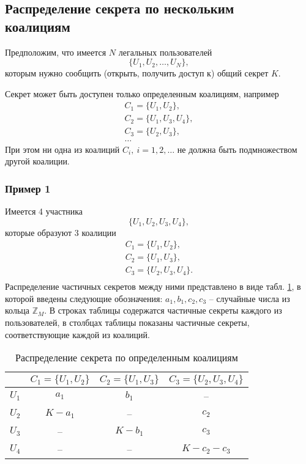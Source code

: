\documentclass[10pt,a4paper]{book}
\newcommand{\group}[1]{\mathbb{#1}}
\newcommand{\Z}{\group{Z}}
\begin{document}
\subsection[Схема для нескольких коалиций]{Распределение секрета по нескольким \protect\\ коалициям}

Предположим, что имеется $N$ легальных пользователей
    \[ \{ U_1, U_2, \dots, U_N \}, \]
которым нужно сообщить (открыть, получить доступ к) общий секрет $K$.

Секрет может быть доступен только определенным  коалициям, например
\[ \begin{array}{l}
    C_1 = \{ U_1, U_2 \}, \\
    C_2 = \{ U_1, U_3, U_4 \}, \\
    C_3 = \{ U_2, U_3 \}, \\
    \dots
\end{array} \]
При этом ни одна из коалиций $C_i, ~ i = 1, 2, \dots$ не должна быть подмножеством другой коалиции.


\subsubsection{Пример 1}

Имеется 4 участника
    \[ \{ U_1, U_2, U_3, U_4 \}, \]
которые образуют 3 коалиции
\[ \begin{array}{l}
    C_1 = \{ U_1, U_2 \}, \\
    C_2 = \{ U_1, U_3 \}, \\
    C_3 = \{ U_2, U_3, U_4 \}. \\
\end{array} \]
Распределение частичных секретов между ними представлено в виде табл. \ref{tab:secret-share-coalition-1}, в которой введены следующие обозначения: $a_1, b_1, c_2, c_3$ -- случайные числа из кольца $\Z_M$. В строках таблицы содержатся частичные секреты каждого из пользователей, в столбцах таблицы показаны частичные секреты, соответствующие каждой из коалиций.

\begin{table}[h!]
    \centering
    \caption{Распределение секрета по определенным коалициям\label{tab:secret-share-coalition-1}}
    \begin{tabular}{|c||c|c|c|}
        \hline
              & $C_1 = \{ U_1, U_2 \}$ & $C_2 = \{U_1, U_3 \}$ & $C_3 = \{ U_2, U_3, U_4 \}$ \\
        \hline \hline
        $U_1$ & $a_1$     & $b_1$     & -- \\
        $U_2$ & $K - a_1$ & --        & $c_2$ \\
        $U_3$ & --        & $K - b_1$ & $c_3$  \\
        $U_4$ & --        & --        & $K - c_2 - c_3$ \\
        \hline
    \end{tabular}
\end{table}
\end{document}
